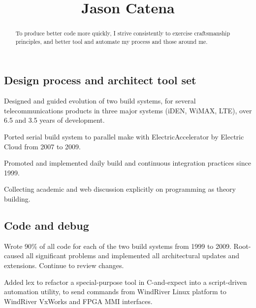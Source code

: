 \documentclass{tufte-handout}
\title{Jason Catena}
\date{}
\begin{document}
\maketitle


\begin{abstract}
To produce better code more quickly, I strive consistently to exercise
craftsmanship principles, and better tool and automate my process and
those around me.
\end{abstract}


\subsection{Design process and architect tool set}

Designed and guided evolution of two build systems, for several
telecommunications products in three major systems (iDEN, WiMAX, LTE),
over 6.5 and 3.5 years of development.

Ported serial build system to parallel make with ElectricAccelerator by
Electric Cloud from 2007 to 2009.

Promoted and implemented daily build and continuous integration
practices since 1999.

Collecting
academic and web discussion explicitly on programming as theory
building.


\subsection{Code and debug}

Wrote 90\% of all code for each of the two build systems from 1999 to
2009.  Root-caused all significant problems and implemented all
architectural updates and extensions.  Continue to review changes.

Added lex to refactor a special-purpose tool in C-and-expect into a
script-driven automation utility, to send commands from WindRiver Linux
platform to WindRiver VxWorks and FPGA MMI interfaces.
\end{document}
